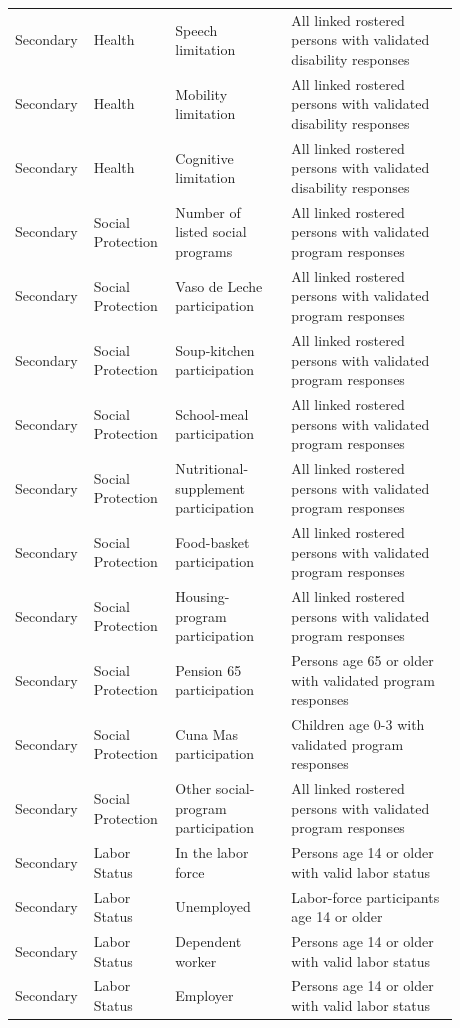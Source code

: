 \begin{longtable}{@{}>{\raggedright\arraybackslash}p{0.10\linewidth}p{0.17\linewidth}p{0.25\linewidth}p{0.36\linewidth}@{}}
Secondary & Health & Speech limitation & All linked rostered persons with validated disability responses \\
Secondary & Health & Mobility limitation & All linked rostered persons with validated disability responses \\
Secondary & Health & Cognitive limitation & All linked rostered persons with validated disability responses \\
Secondary & Social Protection & Number of listed social programs & All linked rostered persons with validated program responses \\
Secondary & Social Protection & Vaso de Leche participation & All linked rostered persons with validated program responses \\
Secondary & Social Protection & Soup-kitchen participation & All linked rostered persons with validated program responses \\
Secondary & Social Protection & School-meal participation & All linked rostered persons with validated program responses \\
Secondary & Social Protection & Nutritional-supplement participation & All linked rostered persons with validated program responses \\
Secondary & Social Protection & Food-basket participation & All linked rostered persons with validated program responses \\
Secondary & Social Protection & Housing-program participation & All linked rostered persons with validated program responses \\
Secondary & Social Protection & Pension 65 participation & Persons age 65 or older with validated program responses \\
Secondary & Social Protection & Cuna Mas participation & Children age 0-3 with validated program responses \\
Secondary & Social Protection & Other social-program participation & All linked rostered persons with validated program responses \\
Secondary & Labor Status & In the labor force & Persons age 14 or older with valid labor status \\
Secondary & Labor Status & Unemployed & Labor-force participants age 14 or older \\
Secondary & Labor Status & Dependent worker & Persons age 14 or older with valid labor status \\
Secondary & Labor Status & Employer & Persons age 14 or older with valid labor status \\

\end{longtable}
